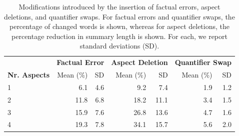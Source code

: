 \begin{table}[h!]
\centering
\caption{Modifications introduced by the insertion of factual errors, aspect deletions, and quantifier swaps. For factual errors and quantifier swaps, the percentage of changed words is shown, whereas for aspect deletions, the percentage reduction in summary length is shown. For each, we report standard deviations (SD).}
\label{tab:modification_percentages}
\begin{tabular}{lrrrrrr}
\toprule
 & \multicolumn{2}{c}{\textbf{Factual Error}} & \multicolumn{2}{c}{\textbf{Aspect Deletion}} & \multicolumn{2}{c}{\textbf{Quantifier Swap}} \\
\textbf{Nr. Aspects} & Mean (\%) & SD & Mean (\%) & SD & Mean (\%) & SD \\
\midrule
1 & 6.1 & 4.6 & 9.2 & 7.4 & 1.9 & 1.2 \\
2 & 11.8 & 6.8 & 18.2 & 11.1 & 3.4 & 1.5 \\
3 & 15.9 & 7.6 & 26.8 & 13.6 & 4.7 & 1.6 \\
4 & 19.3 & 7.8 & 34.1 & 15.7 & 5.6 & 2.0 \\
\bottomrule
\end{tabular}
\end{table}
